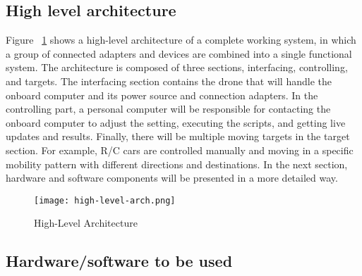 \documentclass[../main.tex]{subfiles}
\begin{document}
\subsection{High level architecture}
Figure ~\ref{fig1:arch-fig} shows a high-level architecture of a complete working system, in which a group of connected adapters and devices are combined into a single functional system. The architecture is composed of three sections, interfacing, controlling, and targets. The interfacing section contains the drone that will handle the onboard computer and its power source and connection adapters. In the controlling part, a personal computer will be responsible for contacting the onboard computer to adjust the setting, executing the scripts, and getting live updates and results. Finally, there will be multiple moving targets in the target section. For example, R/C cars are controlled manually and moving in a specific mobility pattern with different directions and destinations. In the next section, hardware and software components will be presented in a more detailed way.

\begin{figure}[H]
	\centering
	\texttt{[image: high-level-arch.png]}
	\caption{High-Level Architecture}\label{fig1:arch-fig}
\end{figure}


\subsection{Hardware/software to be used}
\end{document}
